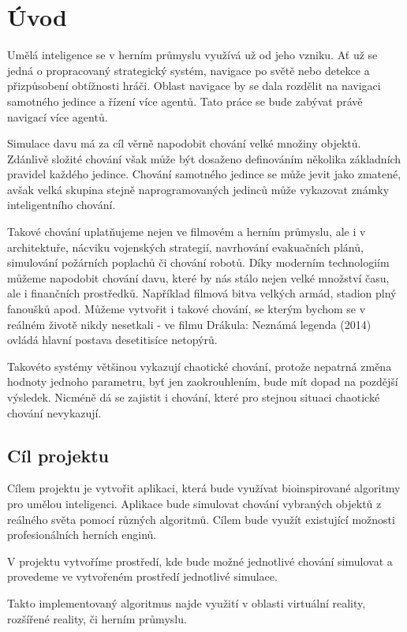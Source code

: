 \section{Úvod}
Umělá inteligence se v herním průmyslu využívá už od jeho vzniku. Ať už se jedná o propracovaný strategický systém, navigace po světě nebo detekce a přizpůsobení obtížnosti hráči. Oblast navigace by se dala rozdělit na navigaci samotného jedince a řízení více agentů. Tato práce se bude zabývat právě navigací více agentů. 
\par
Simulace davu má za cíl věrně napodobit chování velké množiny objektů. Zdánlivě složité chování však může být dosaženo definováním několika základních pravidel každého jedince. Chování samotného jedince se může jevit jako zmatené, avšak velká skupina stejně naprogramovaných jedinců může vykazovat známky inteligentního chování. 
\par
Takové chování uplatňujeme nejen ve filmovém a herním průmyslu, ale i v architektuře, nácviku vojenských strategií, navrhování evakuačních plánů, simulování požárních poplachů či chování robotů. \cite{gammaWeb} Díky moderním technologiím můžeme napodobit chování davu, které by nás stálo nejen velké množství času, ale i finančních prostředků. Například filmová bitva velkých armád, stadion plný fanoušků apod. Můžeme vytvořit i takové chování, se kterým bychom se v reálném životě nikdy nesetkali - ve filmu Drákula: Neznámá legenda (2014) ovládá hlavní postava desetitisíce netopýrů. 
\par 
Takovéto systémy většinou vykazují chaotické chování, protože nepatrná změna hodnoty jednoho parametru, byť jen zaokrouhlením, bude mít dopad na pozdější výsledek. Nicméně dá se zajistit i chování, které pro stejnou situaci chaotické chování nevykazují. 
\subsection{Cíl projektu}
Cílem projektu je vytvořit aplikaci, která bude využívat bioinspirované algoritmy pro umělou inteligenci. Aplikace bude simulovat chování vybraných objektů z reálného světa pomocí různých algoritmů. Cílem bude využít existující možnosti profesionálních herních enginů. 
\par
V projektu vytvoříme prostředí, kde bude možné jednotlivé chování simulovat a provedeme ve vytvořeném prostředí jednotlivé simulace. 
\par
Takto implementovaný algoritmus najde využití v oblasti virtuální reality, rozšířené reality, či herním průmyslu. 
